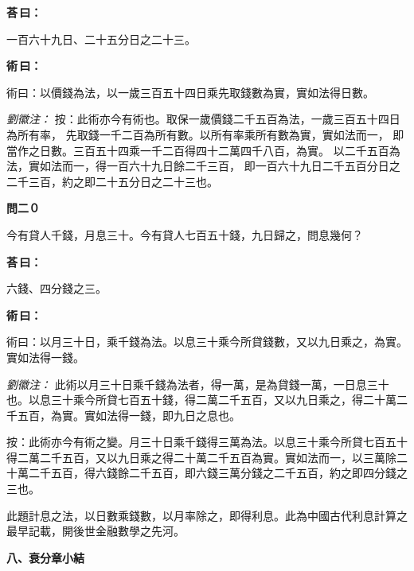 \documentclass[11pt,a4paper]{article}
\newenvironment{problem}[1][]{%
  \par\vspace{0.6em}\noindent\textcolor{problemcolor}{\textbf{問\ignorespaces#1\unskip}\hspace{0.5em}}%
  \ignorespaces
}{\par\vspace{0.4em}}
\newenvironment{answer}{%
  \par\noindent\textcolor{answercolor}{\textbf{荅\,曰：}}%
  \ignorespaces
}{\par\vspace{0.3em}}
\newenvironment{method}{%
  \par\noindent\textcolor{methodcolor}{\textbf{術\,曰：}}%
  \ignorespaces
}{\par\vspace{0.4em}}
\newenvironment{liuhuicomm}{%
  \par\vspace{0.3em}\noindent\textcolor{commentarycolor}{\small\textit{劉徽注：}}}%
  {\par\vspace{0.5em}}
\begin{document}
\begin{answer}
一百六十九日、二十五分日之二十三。
\end{answer}

\begin{method}
術曰：以價錢為法，以一歲三百五十四日乘先取錢數為實，實如法得日數。
\end{method}

\begin{liuhuicomm}
按：此術亦今有術也。取保一歲價錢二千五百為法，一歲三百五十四日為所有率，
先取錢一千二百為所有數。以所有率乘所有數為實，實如法而一，
即當作之日數。三百五十四乘一千二百得四十二萬四千八百，為實。
以二千五百為法，實如法而一，得一百六十九日餘二千三百，
即一百六十九日二千五百分日之二千三百，約之即二十五分日之二十三也。
\end{liuhuicomm}

\begin{problem}[二０]
今有貸人千錢，月息三十。今有貸人七百五十錢，九日歸之，問息幾何？
\end{problem}

\begin{answer}
六錢、四分錢之三。
\end{answer}

\begin{method}
術曰：以月三十日，乘千錢為法。以息三十乘今所貸錢數，又以九日乘之，為實。實如法得一錢。
\end{method}

\begin{liuhuicomm}
此術以月三十日乘千錢為法者，得一萬，是為貸錢一萬，一日息三十也。以息三十乘今所貸七百五十錢，得二萬二千五百，又以九日乘之，得二十萬二千五百，為實。實如法得一錢，即九日之息也。

按：此術亦今有術之變。月三十日乘千錢得三萬為法。以息三十乘今所貸七百五十得二萬二千五百，又以九日乘之得二十萬二千五百為實。實如法而一，以三萬除二十萬二千五百，得六錢餘二千五百，即六錢三萬分錢之二千五百，約之即四分錢之三也。

此題計息之法，以日數乘錢數，以月率除之，即得利息。此為中國古代利息計算之最早記載，開後世金融數學之先河。
\end{liuhuicomm}

\vspace{0.8em}
\noindent\textbf{\large 八、衰分章小結}
\vspace{0.5em}
\end{document}
